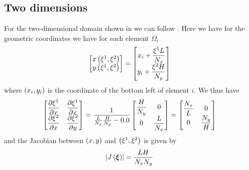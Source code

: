 \subsection{Two dimensions}
\label{subsec:ElementStiffnessMatrixLaplace2D}

For the two-dimensional domain shown in
 we can follow
. Here we have for the geometric
coordinates we have for each element $\Omega_{i}$
\begin{equation}
  \begin{bmatrix}
     x\left( \xi^{1},\xi^{2} \right)  \\
     y\left( \xi^{1},\xi^{2} \right) 
  \end{bmatrix}= \begin{bmatrix}
    x_{i}+\dfrac{\xi^{1} L}{N_{x}} \\
    y_{i}+\dfrac{\xi^{2} H}{N_{y}}  
  \end{bmatrix}
\end{equation}
where $\left( x_{i},y_{i} \right)$ is the coordinate of the bottom left of element $i$. We thus have 
\begin{equation}
  \begin{bmatrix}
     \dfrac{\partial \xi^{1}}{\partial x}  &  \dfrac{\partial \xi^{1}}{\partial x}  \\
     \dfrac{\partial \xi^{2}}{\partial x}  &  \dfrac{\partial \xi^{2}}{\partial y}          
  \end{bmatrix} = \dfrac{1}{\frac{L}{N_{x}}\frac{H}{N_{y}}-0.0} \begin{bmatrix}
    \dfrac{H}{N_{y}} & 0 \\
    0 & \dfrac{L}{N_{x}}
  \end{bmatrix} = \begin{bmatrix}
    \dfrac{N_{x}}{L} & 0 \\
    0 & \dfrac{N_{y}}{H}
  \end{bmatrix}
\end{equation}
and the Jacobian between $\left( x,y \right)$ and $\left( \xi^{1},\xi^{2} \right)$ is given by
\begin{equation}
  \left|  J\left(  \boldsymbol{\xi}  \right)  \right|=\dfrac{LH}{N_{x}N_{y}}
\end{equation}

